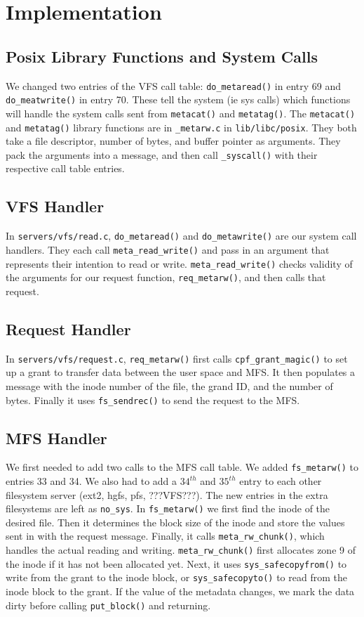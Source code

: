\documentclass[10pt]{article}
\begin{document}
\section*{Implementation}

\subsection*{Posix Library Functions and System Calls}
We changed two entries of the  VFS call table:  {\tt do\_metaread()} in entry 69 and {\tt do\_meatwrite()} in entry 70.  These tell the system (ie sys calls) which functions will handle the system calls sent from {\tt metacat()} and {\tt metatag()}.  The {\tt metacat()} and {\tt metatag()} library functions are in {\tt \_metarw.c} in {\tt lib/libc/posix}.  They both take a file descriptor, number of bytes, and buffer pointer as arguments.  They pack the arguments into a message, and then call {\tt \_syscall()} with their respective call table entries.

\subsection*{VFS Handler}
In {\tt servers/vfs/read.c}, {\tt do\_metaread()} and {\tt do\_metawrite()} are our system call handlers.  They each call {\tt meta\_read\_write()} and pass in an argument that represents their intention to read or write.  {\tt meta\_read\_write()} checks validity of the arguments for our request function, {\tt req\_metarw()}, and then calls that request.

\subsection*{Request Handler}
In {\tt servers/vfs/request.c}, {\tt req\_metarw()} first calls {\tt cpf\_grant\_magic()} to set up a grant to transfer data between the user space and MFS.  It then populates a message with the inode number of the file, the grand ID, and the number of bytes.  Finally it uses {\tt fs\_sendrec()} to send the request to the MFS.

\subsection*{MFS Handler}
We first needed to add two calls to the MFS call table.  We added {\tt fs\_metarw()} to entries 33 and 34.  We also had to add a $34^{th}$ and $35^{th}$ entry to each other filesystem server (ext2, hgfs, pfs, ???VFS???).  The new entries in the extra filesystems are left as {\tt no\_sys}.  In {\tt fs\_metarw()} we first find the inode of the desired file.  Then it determines the block size of the inode and store the values sent in with the request message.  Finally, it calls {\tt meta\_rw\_chunk()}, which handles the actual reading and writing.  {\tt meta\_rw\_chunk()} first allocates zone 9 of the inode if it has not been allocated yet.  Next, it uses {\tt sys\_safecopyfrom()} to write from the grant to the inode block, or {\tt sys\_safecopyto()} to read from the inode block to the grant.  If the value of the metadata changes, we mark the data dirty before calling {\tt put\_block()} and returning.
\end{document}
